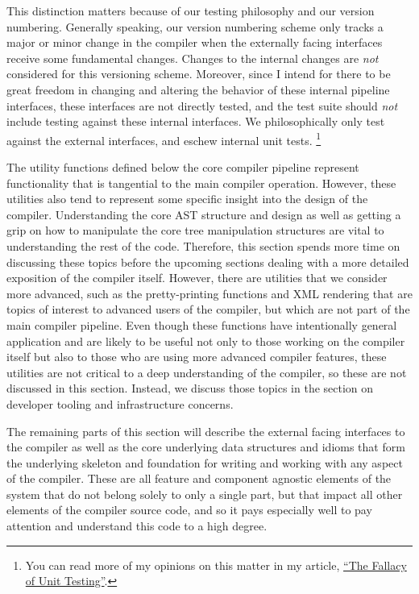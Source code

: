 \documentclass{article}%
\begin{document}
This distinction matters because of our testing philosophy and our
version numbering. 
Generally speaking, our version numbering scheme only tracks a major
or minor change in the compiler when the externally facing interfaces
receive some fundamental changes.
Changes to the internal changes are \emph{not} considered for this
versioning scheme.
Moreover, since I intend for there to be great freedom in changing 
and altering the behavior of these internal pipeline interfaces,
these interfaces are not directly tested, 
and the test suite should \emph{not} include testing against these
internal interfaces.
We philosophically only test against the external interfaces,
and eschew internal unit tests.%
\footnote{You can read more of my opinions on this matter
in my article, 
\href{https://www.sacrideo.us/the-fallacy-of-unit-testing/}
{``The Fallacy of Unit Testing''}.}

The utility functions defined below the core compiler pipeline
represent functionality that is tangential to the main compiler
operation.
However, these utilities also tend to represent some specific 
insight into the design of the compiler.
Understanding the core AST structure and design as well as 
getting a grip on how to manipulate the core tree manipulation
structures are vital to understanding the rest of the code.
Therefore, this section spends more time on discussing these
topics before the upcoming sections dealing with a more detailed 
exposition of the compiler itself.
However, there are utilities that we consider more advanced, 
such as the pretty-printing functions and XML rendering
that are topics of interest to advanced users of the compiler,
but which are not part of the main compiler pipeline.
Even though these functions have intentionally general 
application and are likely to be useful not only to those 
working on the compiler itself but also to those who are using 
more advanced compiler features, 
these utilities are not critical to a deep understanding 
of the compiler, 
so these are not discussed in this section. 
Instead, we discuss those topics in the section on developer 
tooling and infrastructure concerns.

The remaining parts of this section will describe the external
facing interfaces to the compiler as well as the core underlying 
data structures and idioms that form the underlying skeleton and 
foundation for writing and working with any aspect of the compiler.
These are all feature and component agnostic elements of the system
that do not belong solely to only a single part, 
but that impact all other elements of the compiler source code,
and so it pays especially well to pay attention and understand
this code to a high degree.
\end{document}
